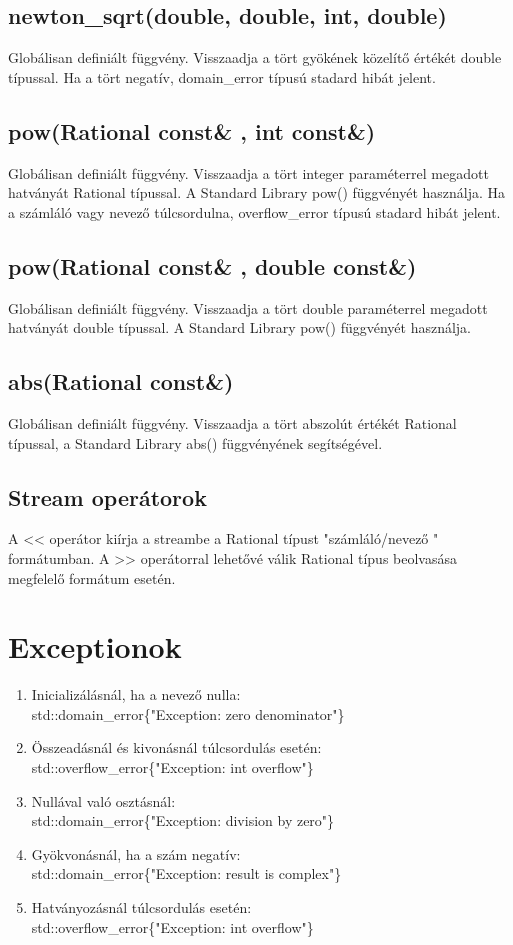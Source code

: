\documentclass[a4paper, 12pt]{article}
\begin{document}
\subsection*{newton\_sqrt(double, double, int, double)}
Globálisan definiált függvény. Visszaadja a tört gyökének közelítő értékét double típussal. Ha a tört negatív, domain\_error típusú stadard hibát jelent.

\subsection*{pow(Rational const\& , int const\&)}
Globálisan definiált függvény. Visszaadja a tört integer paraméterrel megadott hatványát Rational típussal. A Standard Library pow() függvényét használja. Ha a számláló vagy nevező túlcsordulna, overflow\_error típusú stadard hibát jelent.

\subsection*{pow(Rational const\& , double const\&)}
Globálisan definiált függvény. Visszaadja a tört double paraméterrel megadott hatványát double típussal. A Standard Library pow() függvényét használja.

\subsection*{abs(Rational const\&)}
Globálisan definiált függvény. Visszaadja a tört abszolút értékét Rational típussal, a Standard Library abs() függvényének segítségével.

\subsection*{Stream operátorok}
A << operátor kiírja a streambe a Rational típust "számláló/nevező " formátumban. A >> operátorral lehetővé válik Rational típus beolvasása megfelelő formátum esetén.

\section{Exceptionok}
\begin{enumerate}
  \item Inicializálásnál, ha a nevező nulla: \\std::domain\_error\{"Exception: zero denominator"\}
  \item Összeadásnál és kivonásnál túlcsordulás esetén:\\ std::overflow\_error\{"Exception: int overflow"\}
  \item Nullával való osztásnál: \\std::domain\_error\{"Exception: division by zero"\}
  \item Gyökvonásnál, ha a szám negatív: \\std::domain\_error\{"Exception: result is complex"\}
  \item Hatványozásnál túlcsordulás esetén: \\std::overflow\_error\{"Exception: int overflow"\}
\end{enumerate}
\end{document}
